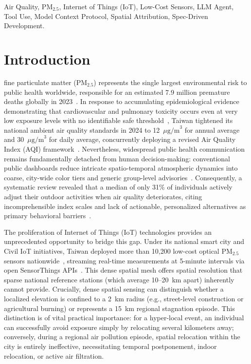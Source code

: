 \documentclass[conference]{IEEEtran}
\begin{document}
\begin{IEEEkeywords}
Air Quality, $\text{PM}_{2.5}$, Internet of Things (IoT), Low-Cost Sensors, LLM Agent, Tool Use, Model Context Protocol, Spatial Attribution, Spec-Driven Development.
\end{IEEEkeywords}

\section{Introduction}
 fine particulate matter ($\text{PM}_{2.5}$) represents the single largest environmental risk to public health worldwide, responsible for an estimated 7.9 million premature deaths globally in 2023~\cite{s_060}. In response to accumulating epidemiological evidence demonstrating that cardiovascular and pulmonary toxicity occurs even at very low exposure levels with no identifiable safe threshold~\cite{s_020, s_021}, Taiwan tightened its national ambient air quality standards in 2024 to 12~$\mu\text{g/m}^3$ for annual average and 30~$\mu\text{g/m}^3$ for daily average, concurrently deploying a revised Air Quality Index (AQI) framework~\cite{s_016}. Nevertheless, widespread public health communication remains fundamentally detached from human decision-making: conventional public dashboards reduce intricate spatio-temporal atmospheric dynamics into coarse, city-wide color tiers and generic group-level advisories~\cite{s_032}. Consequently, a systematic review revealed that a median of only 31\% of individuals actively adjust their outdoor activities when air quality deteriorates, citing incomprehensible index scales and lack of actionable, personalized alternatives as primary behavioral barriers~\cite{s_028}.

The proliferation of Internet of Things (IoT) technologies provides an unprecedented opportunity to bridge this gap. Under its national smart city and Civil IoT initiatives, Taiwan deployed more than 10,200 low-cost optical $\text{PM}_{2.5}$ sensors nationwide~\cite{s_013}, streaming real-time measurements at 5-minute intervals via open SensorThings APIs~\cite{s_001}. This dense spatial mesh offers spatial resolution that sparse national reference stations (which average 10--20~km apart) inherently cannot provide. Crucially, dense spatial sensing can distinguish whether a localized elevation is confined to a 2~km radius (e.g., street-level construction or agricultural burning) or represents a 15~km regional stagnation episode. This distinction is of vital practical importance: for a hyper-local event, an individual can successfully avoid exposure simply by relocating several kilometers away; conversely, during a regional air pollution episode, spatial relocation within the city is entirely ineffective, necessitating temporal postponement, indoor relocation, or active air filtration.
\end{document}
